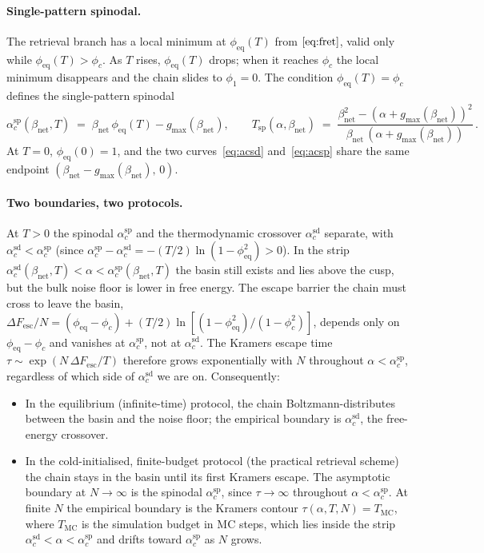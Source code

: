 \documentclass[11pt]{article}
\newcommand{\Bnet}{\beta_{\mathrm{net}}}
\newcommand{\phieq}{\phi_{\mathrm{eq}}}
\newcommand{\gmax}{g_{\max}}
\newcommand{\acSd}{\alpha_c^{\mathrm{sd}}}
\newcommand{\acSp}{\alpha_c^{\mathrm{sp}}}
\begin{document}
\paragraph{Single-pattern spinodal.}
The retrieval branch has a local minimum at $\phieq(T)$ from
$\eqref{eq:fret}$, valid only while $\phieq(T) > \phi_c$.  As $T$
rises, $\phieq(T)$ drops; when it reaches $\phi_c$ the local minimum
disappears and the chain slides to $\phi_1 = 0$.  The condition
$\phieq(T) = \phi_c$ defines the single-pattern spinodal
\begin{equation}
\acSp(\Bnet, T) \;=\; \Bnet\,\phieq(T) - \gmax(\Bnet),
\qquad
T_{\mathrm{sp}}(\alpha, \Bnet)
   \;=\; \frac{\Bnet^2 - (\alpha + \gmax(\Bnet))^2}
              {\Bnet\,(\alpha + \gmax(\Bnet))}\,.
\label{eq:acsp}
\end{equation}
At $T = 0$, $\phieq(0) = 1$, and the two curves~\eqref{eq:acsd}
and~\eqref{eq:acsp} share the same endpoint
$(\Bnet - \gmax(\Bnet),\,0)$.

\paragraph{Two boundaries, two protocols.}
At $T > 0$ the spinodal $\acSp$ and the thermodynamic crossover
$\acSd$ separate, with $\acSd < \acSp$ (since
$\acSp - \acSd = -(T/2)\ln(1 - \phieq^2) > 0$).  In the strip
$\acSd(\Bnet, T) < \alpha < \acSp(\Bnet, T)$ the basin still exists and
lies above the cusp, but the bulk noise floor is lower in free energy.
The escape barrier the chain must cross to leave the basin,
$\Delta F_{\mathrm{esc}}/N
   = (\phieq - \phi_c) + (T/2) \ln[(1 - \phieq^2)/(1 - \phi_c^2)]$,
depends only on $\phieq - \phi_c$ and vanishes at $\acSp$, not at
$\acSd$.  The Kramers escape time
$\tau \sim \exp(N\,\Delta F_{\mathrm{esc}}/T)$ therefore grows
exponentially with $N$ throughout $\alpha < \acSp$, regardless of which
side of $\acSd$ we are on.  Consequently:

\begin{itemize}
\item In the equilibrium (infinite-time) protocol, the chain
Boltzmann-distributes between the basin and the noise floor; the
empirical boundary is $\acSd$, the free-energy crossover.
\item In the cold-initialised, finite-budget protocol (the practical
retrieval scheme) the chain stays in the basin until its first Kramers
escape.  The asymptotic boundary at $N \to \infty$ is the spinodal
$\acSp$, since $\tau \to \infty$ throughout $\alpha < \acSp$.  At
finite $N$ the empirical boundary is the Kramers contour
$\tau(\alpha, T, N) = T_{\mathrm{MC}}$, where $T_{\mathrm{MC}}$ is the simulation budget in MC steps, which lies inside the strip
$\acSd < \alpha < \acSp$ and drifts toward $\acSp$ as $N$ grows.
\end{itemize}
\end{document}
